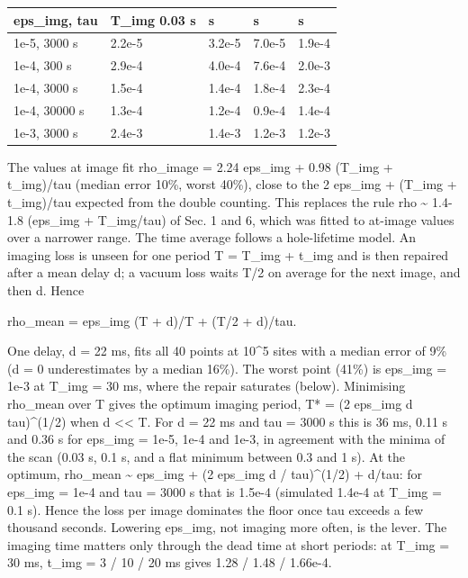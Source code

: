 {\small
\begin{longtable}[]{@{}>{\raggedright\arraybackslash}p{0.281\dimexpr(\linewidth-10\tabcolsep)\relax}>{\raggedright\arraybackslash}p{0.180\dimexpr(\linewidth-10\tabcolsep)\relax}>{\raggedright\arraybackslash}p{0.180\dimexpr(\linewidth-10\tabcolsep)\relax}>{\raggedright\arraybackslash}p{0.180\dimexpr(\linewidth-10\tabcolsep)\relax}>{\raggedright\arraybackslash}p{0.180\dimexpr(\linewidth-10\tabcolsep)\relax}@{}}
\toprule\noalign{}
eps\_img, tau & T\_img 0.03 s & 0.1 s & 0.3 s & 1 s \\
\midrule\noalign{}
\endhead
\bottomrule\noalign{}
\endlastfoot
1e-5, 3000 s & 2.2e-5 & 3.2e-5 & 7.0e-5 & 1.9e-4 \\
1e-4, 300 s & 2.9e-4 & 4.0e-4 & 7.6e-4 & 2.0e-3 \\
1e-4, 3000 s & 1.5e-4 & 1.4e-4 & 1.8e-4 & 2.3e-4 \\
1e-4, 30000 s & 1.3e-4 & 1.2e-4 & 0.9e-4 & 1.4e-4 \\
1e-3, 3000 s & 2.4e-3 & 1.4e-3 & 1.2e-3 & 1.2e-3 \\
\end{longtable}
}

The values at image fit rho\_image = 2.24 eps\_img + 0.98 (T\_img +
t\_img)/tau (median error 10\%, worst 40\%), close to the 2 eps\_img +
(T\_img + t\_img)/tau expected from the double counting. This replaces
the rule rho \textasciitilde{} 1.4-1.8 (eps\_img + T\_img/tau) of Sec. 1
and 6, which was fitted to at-image values over a narrower range. The
time average follows a hole-lifetime model. An imaging loss is unseen
for one period T = T\_img + t\_img and is then repaired after a mean
delay d; a vacuum loss waits T/2 on average for the next image, and then
d. Hence

rho\_mean = eps\_img (T + d)/T + (T/2 + d)/tau.

One delay, d = 22 ms, fits all 40 points at 10\^{}5 sites with a median
error of 9\% (d = 0 underestimates by a median 16\%). The worst point
(41\%) is eps\_img = 1e-3 at T\_img = 30 ms, where the repair saturates
(below). Minimising rho\_mean over T gives the optimum imaging period,
T* = (2 eps\_img d tau)\^{}(1/2) when d \textless\textless{} T. For d =
22 ms and tau = 3000 s this is 36 ms, 0.11 s and 0.36 s for eps\_img =
1e-5, 1e-4 and 1e-3, in agreement with the minima of the scan (0.03 s,
0.1 s, and a flat minimum between 0.3 and 1 s). At the optimum,
rho\_mean \textasciitilde{} eps\_img + (2 eps\_img d / tau)\^{}(1/2) +
d/tau: for eps\_img = 1e-4 and tau = 3000 s that is 1.5e-4 (simulated
1.4e-4 at T\_img = 0.1 s). Hence the loss per image dominates the floor
once tau exceeds a few thousand seconds. Lowering eps\_img, not imaging
more often, is the lever. The imaging time matters only through the dead
time at short periods: at T\_img = 30 ms, t\_img = 3 / 10 / 20 ms gives
1.28 / 1.48 / 1.66e-4.

